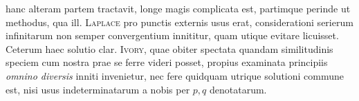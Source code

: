 hanc alteram partem tractavit, longe magis complicata est, partimque perinde ut methodus, qua ill. \textsc{Laplace} pro punctis externis usus erat, considerationi serierum infinitarum non semper convergentium innititur, quam utique evitare licuisset. Ceterum haec solutio clar. \textsc{Ivory}, quae obiter spectata quandam similitudinis speciem cum nostra prae se ferre videri posset, propius examinata principiis \textit{omnino diversis} inniti invenietur, nec fere quidquam utrique solutioni commune est, nisi usus indeterminatarum a nobis per $p,q$ denotatarum.
